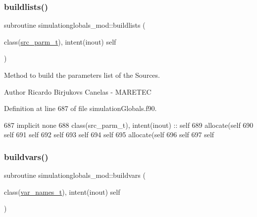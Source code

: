 \subsubsection{\texorpdfstring{buildlists()}{buildlists()}}
{\footnotesize\ttfamily subroutine simulationglobals\+\_\+mod\+::buildlists (\begin{DoxyParamCaption}\item[{class(\mbox{\hyperlink{structsimulationglobals__mod_1_1src__parm__t}{src\+\_\+parm\+\_\+t}}), intent(inout)}]{self }\end{DoxyParamCaption})\hspace{0.3cm}{\ttfamily [private]}}



Method to build the parameters list of the Sources. 

\begin{DoxyAuthor}{Author}
Ricardo Birjukovs Canelas -\/ M\+A\+R\+E\+T\+EC 
\end{DoxyAuthor}


Definition at line 687 of file simulation\+Globals.\+f90.


\begin{DoxyCode}
687     \textcolor{keywordtype}{implicit none}
688     \textcolor{keywordtype}{class}(src\_parm\_t), \textcolor{keywordtype}{intent(inout)} :: self
689     \textcolor{keyword}{allocate}(self%
690     self%
691     self%
692     self%
693     self%
694     self%
695     \textcolor{keyword}{allocate}(self%
696     self%
697     self%
\end{DoxyCode}
\mbox{\label{namespacesimulationglobals__mod_a4aa829af1699c705e46f47bb023ac162}} 
\subsubsection{\texorpdfstring{buildvars()}{buildvars()}}
{\footnotesize\ttfamily subroutine simulationglobals\+\_\+mod\+::buildvars (\begin{DoxyParamCaption}\item[{class(\mbox{\hyperlink{structsimulationglobals__mod_1_1var__names__t}{var\+\_\+names\+\_\+t}}), intent(inout)}]{self }\end{DoxyParamCaption})\hspace{0.3cm}{\ttfamily [private]}}



